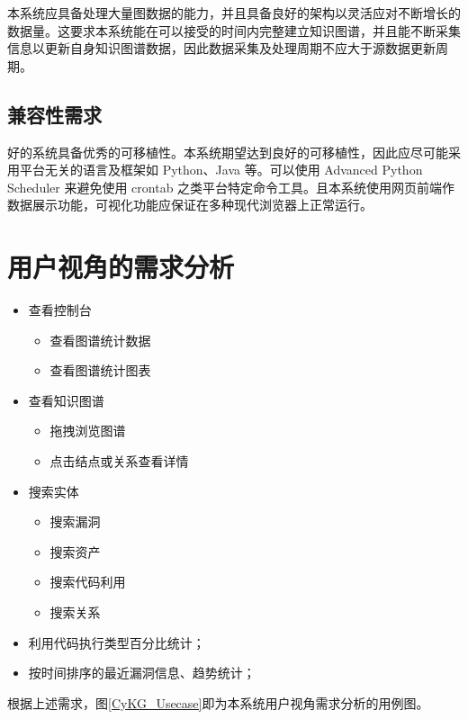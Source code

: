 \documentclass[a4paper,AutoFakeBold,oneside,12pt]{book}
\begin{document}
本系统应具备处理大量图数据的能力，并且具备良好的架构以灵活应对不断增长的数据量。这要求本系统能在可以接受的时间内完整建立知识图谱，并且能不断采集信息以更新自身知识图谱数据，因此数据采集及处理周期不应大于源数据更新周期。

\subsection{兼容性需求}

好的系统具备优秀的可移植性。本系统期望达到良好的可移植性，因此应尽可能采用平台无关的语言及框架如 Python、Java 等。可以使用 Advanced Python Scheduler 来避免使用 crontab 之类平台特定命令工具。且本系统使用网页前端作数据展示功能，可视化功能应保证在多种现代浏览器上正常运行。

\section{用户视角的需求分析}

\begin{itemize}
	\item 查看控制台
	      \begin{itemize}
		      \item 查看图谱统计数据
		      \item 查看图谱统计图表
	      \end{itemize}
	\item 查看知识图谱
	      \begin{itemize}
		      \item 拖拽浏览图谱
		      \item 点击结点或关系查看详情
	      \end{itemize}
	\item 搜索实体
	      \begin{itemize}
		      \item 搜索漏洞
		      \item 搜索资产
		      \item 搜索代码利用
		      \item 搜索关系
	      \end{itemize}
	\item 利用代码执行类型百分比统计；
	\item 按时间排序的最近漏洞信息、趋势统计；
\end{itemize}

根据上述需求，图\ref{CyKG_Usecase}即为本系统用户视角需求分析的用例图。

\end{document}
